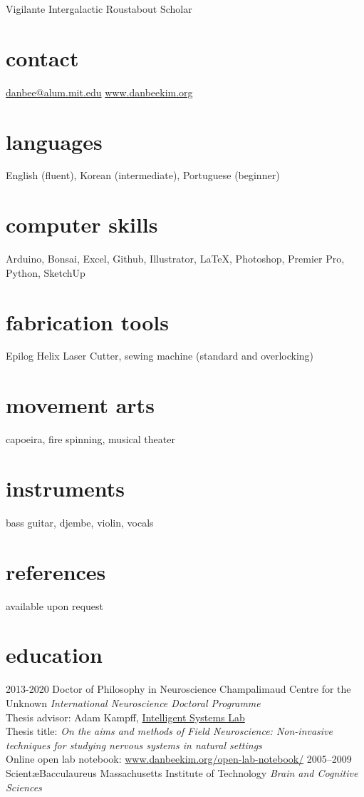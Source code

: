 \documentclass[]{friggeri-cv}
\begin{document}
       {Vigilante Intergalactic Roustabout Scholar}


\begin{aside}
  \section{contact}
    \href{mailto:danbee@alum.mit.edu}{danbee@alum.mit.edu}
    \href{www.danbeekim.org}{www.danbeekim.org}
  \section{languages}
    English (fluent),
    Korean (intermediate),
    Portuguese (beginner)
  \section{computer skills}
    Arduino, Bonsai, Excel,
    Github, Illustrator, 
    \LaTeX, Photoshop,
    Premier Pro, Python,
    SketchUp
  \section{fabrication tools}
    Epilog Helix Laser Cutter, sewing machine (standard and overlocking)
  \section{movement arts}
    capoeira, fire spinning,
    musical theater
  \section{instruments}
    bass guitar, djembe,
    violin, vocals
  \section{references}
    available upon request        
\end{aside}

\section{education}

\begin{entrylist}
  \entry
    {2013-2020}
    {Doctor of Philosophy in Neuroscience}
    {Champalimaud Centre for the Unknown}
    {\emph{International Neuroscience Doctoral Programme}\\
    Thesis advisor: Adam Kampff, \href{www.kampff-lab.org}{Intelligent Systems Lab}\\
    Thesis title: \emph{On the aims and methods of Field Neuroscience: Non-invasive techniques for studying nervous systems in natural settings}\\
    Online open lab notebook: \href{http://www.danbeekim.org/open-lab-notebook/}{www.danbeekim.org/open-lab-notebook/}}
  \entry
    {2005–2009}
    {Scient\ae Bacculaureus}
    {Massachusetts Institute of Technology}
    {\emph{Brain and Cognitive Sciences}}
\end{entrylist}
\end{document}
